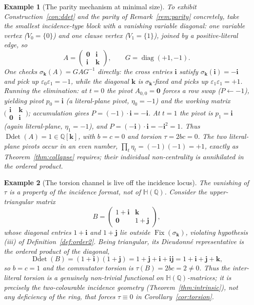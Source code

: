 \documentclass[pdflatex,sn-mathphys-num]{sn-jnl}
\theoremstyle{thmstyleone}%
\theoremstyle{thmstyletwo}%
\newtheorem{example}{Example}%
\theoremstyle{thmstylethree}%
\newcommand{\HH}{\mathbb{H}}
\newcommand{\QQ}{\mathbb{Q}}
\newcommand{\Ddet}{\operatorname{Ddet}}
\newcommand{\Fix}{\operatorname{Fix}}
\newcommand{\bi}{\mathbf{i}}
\newcommand{\bj}{\mathbf{j}}
\newcommand{\bk}{\mathbf{k}}
\DeclareMathOperator{\diag}{diag}
\begin{document}
\begin{example}[The parity mechanism at minimal size]\label{ex:elim}
To exhibit Construction~\ref{con:ddet} and the parity of
Remark~\ref{rem:parity} concretely, take the smallest incidence-type block
with a vanishing variable diagonal: one variable vertex ($V_0=\{0\}$) and
one clause vertex ($V_1=\{1\}$), joined by a positive-literal edge, so
\[
  A=\begin{pmatrix}\mathbf 0 & \bi\\[2pt] \bi & \bk\end{pmatrix},
  \qquad G=\diag(+1,-1).
\]
One checks $\sigma_{\bk}(A)=GAG^{-1}$ directly: the cross entries $\bi$
satisfy $\sigma_{\bk}(\bi)=-\bi$ and pick up $\varepsilon_0\varepsilon_1=-1$,
while the diagonal $\bk$ is $\sigma_{\bk}$-fixed and picks up
$\varepsilon_1\varepsilon_1=+1$. Running the elimination: at $t=0$ the pivot
$A_{0,0}=\mathbf 0$ forces a row swap ($P\gets-1$), yielding pivot
$p_0=\bi$ (a literal-plane pivot, $\eta_0=-1$) and the working matrix
$\bigl(\begin{smallmatrix}\bi&\bk\\ \mathbf0&\bi\end{smallmatrix}\bigr)$;
accumulation gives $P=(-1)\cdot\bi=-\bi$. At $t=1$ the pivot is
$p_1=\bi$ (again literal-plane, $\eta_1=-1$), and $P=(-\bi)\cdot\bi
=-\bi^2=1$. Thus $\Ddet(A)=1\in\QQ[\bk]$, with $b=c=0$ and torsion
$\tau=2bc=0$. The two literal-plane pivots occur in an \emph{even} number,
$\prod_t\eta_t=(-1)(-1)=+1$, exactly as Theorem~\ref{thm:collapse}
requires; their individual non-centrality is annihilated in the ordered
product.
\end{example}

\begin{example}[The torsion channel is live off the incidence locus]
\label{ex:live}
The vanishing of $\tau$ is a property of the incidence \emph{format}, not of
$\HH(\QQ)$. Consider the upper-triangular matrix
\[
  B=\begin{pmatrix}1+\bi & \bk\\[2pt] \mathbf 0 & 1+\bj\end{pmatrix},
\]
whose diagonal entries $1+\bi$ and $1+\bj$ lie \emph{outside}
$\Fix(\sigma_{\bk})$, violating hypothesis (iii) of
Definition~\ref{def:order2}. Being triangular, its Dieudonn\'e
representative is the ordered product of the diagonal,
\[
  \Ddet(B)=(1+\bi)(1+\bj)=1+\bj+\bi+\bi\bj=1+\bi+\bj+\bk,
\]
so $b=c=1$ and the commutator torsion is $\tau(B)=2bc=2\neq0$. Thus the
inter-literal torsion is a genuinely non-trivial functional on
$\HH(\QQ)$-matrices; it is precisely the two-colourable incidence geometry
(Theorem~\ref{thm:intrinsic}), not any deficiency of the ring, that forces
$\tau\equiv0$ in Corollary~\ref{cor:torsion}.
\end{example}
\end{document}
